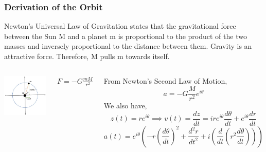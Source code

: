 \documentclass[10pt]{beamer}
\begin{document}
\begin{frame}
    \fontsize{9pt}{10pt}\selectfont
    \frametitle{Derivation of the Orbit}
    Newton’s Universal Law of Gravitation states that the gravitational force between the Sun M and a planet m is proportional to the product of the two masses and inversely proportional to the distance between them. Gravity is an attractive force. Therefore, M pulls m towards itself.
	\begin{columns}
        \centering
        \includegraphics[height=0.4\textheight,width=\textwidth]{images/1.jpg}
        \vfill

        \begin{center}
           $F=-G\frac{mM}{r^2}$
        \end{center}
        From Newton's Second Law of Motion,
        \begin{equation}
               a=-G\frac{M}{r^2}e^{i\theta}
        \end{equation}
        We also have,
        $$
        z(t)=re^{i\theta} \implies
        v(t)=\frac{dz}{dt}=ire^{i\theta}\frac{d\theta}{dt}+e^{i\theta}\frac{dr}{dt}
        $$
        \begin{equation}
        a(t)=e^{i\theta}(-r(\frac{d\theta}{dt})^2+\frac{d^2r}{dt^2}+i( \frac{d}{dt}(r^2\frac{d\theta}{dt})))
        \end{equation}
	\end{columns}
\end{frame}
\end{document}
